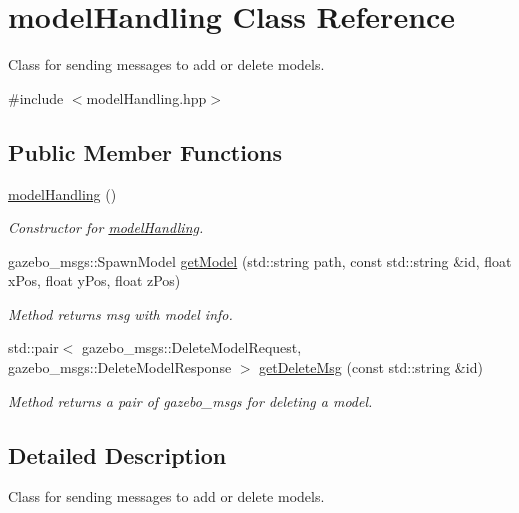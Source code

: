 \hypertarget{classmodelHandling}{}\section{model\+Handling Class Reference}
\label{classmodelHandling}


Class for sending messages to add or delete models.  




{\ttfamily \#include $<$model\+Handling.\+hpp$>$}

\subsection*{Public Member Functions}
\begin{DoxyCompactItemize}
\item 
\hyperlink{classmodelHandling_aa11bfe4b63bbaac07c55df878f37a806}{model\+Handling} ()\hypertarget{classmodelHandling_aa11bfe4b63bbaac07c55df878f37a806}{}\label{classmodelHandling_aa11bfe4b63bbaac07c55df878f37a806}

\begin{DoxyCompactList}\small\item\em Constructor for \hyperlink{classmodelHandling}{model\+Handling}. \end{DoxyCompactList}\item 
gazebo\+\_\+msgs\+::\+Spawn\+Model \hyperlink{classmodelHandling_af5bbb6d4c89bf8569d9de533525c7e75}{get\+Model} (std\+::string path, const std\+::string \&id, float x\+Pos, float y\+Pos, float z\+Pos)
\begin{DoxyCompactList}\small\item\em Method returns msg with model info. \end{DoxyCompactList}\item 
std\+::pair$<$ gazebo\+\_\+msgs\+::\+Delete\+Model\+Request, gazebo\+\_\+msgs\+::\+Delete\+Model\+Response $>$ \hyperlink{classmodelHandling_a7e1c0736c2934ab2826b32c4917d2997}{get\+Delete\+Msg} (const std\+::string \&id)
\begin{DoxyCompactList}\small\item\em Method returns a pair of gazebo\+\_\+msgs for deleting a model. \end{DoxyCompactList}\end{DoxyCompactItemize}


\subsection{Detailed Description}
Class for sending messages to add or delete models. 

